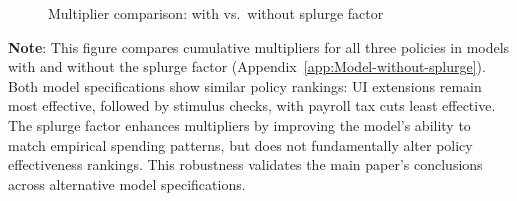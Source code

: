 \documentclass{econsocart}
\begin{document}
\begin{figure}[H]
  \centering
  \caption{\pregenmark Multiplier comparison: with vs.\ without splurge factor}
  \label{fig:cumulativemultipliers_SplurgeComp} %
\end{figure}
\noindent\parbox{\textwidth}{\footnotesize
  \textbf{Note}: This figure compares cumulative multipliers for all three policies
  in models with and without the splurge factor (Appendix~\ref{app:Model-without-splurge}).
  Both model specifications show similar policy rankings: UI extensions remain most effective,
  followed by stimulus checks, with payroll tax cuts least effective.
  The splurge factor enhances multipliers by improving the model's ability to match
  empirical spending patterns, but does not fundamentally alter policy effectiveness rankings.
  This robustness validates the main paper's conclusions across alternative model specifications.
}

\vspace{1em}  %
\end{document}
